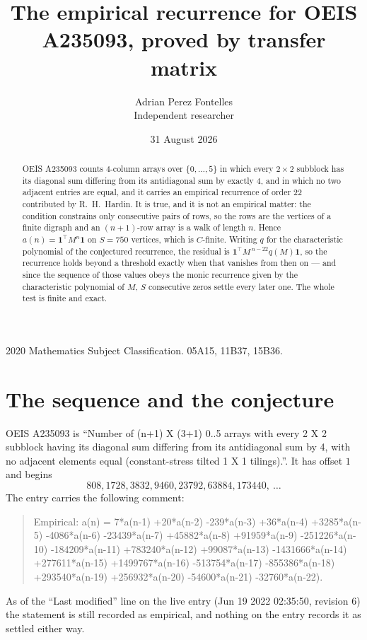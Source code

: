 \documentclass[11pt,a4paper]{article}
\title{The empirical recurrence for OEIS A235093, proved by transfer matrix}
\author{Adrian Perez Fontelles\\ \small Independent researcher}
\date{31 August 2026}
\theoremstyle{plain}
\theoremstyle{definition}
\begin{document}
\maketitle

\begin{abstract}
OEIS A235093 counts $4$-column arrays over $\{0,\dots,5\}$ in which every
$2\times2$ subblock has its diagonal sum differing from its antidiagonal sum by
exactly $4$, and in which no two adjacent entries are equal, and it
carries an empirical recurrence of order $22$ contributed by R.~H.~Hardin. It is true,
and it is not an empirical matter: the condition constrains only consecutive pairs of rows,
so the rows are the vertices of a finite digraph and an $(n+1)$-row array is a walk of
length $n$. Hence $a(n)=\mathbf{1}^{\!\top}M^{n}\mathbf{1}$ on $S=750$ vertices, which
is $C$-finite. Writing $q$ for the characteristic polynomial of the conjectured recurrence,
the residual is $\mathbf{1}^{\!\top}M^{\,n-22}q(M)\mathbf{1}$, so the recurrence
holds beyond a threshold exactly when that vanishes from then on --- and since the sequence
of those values obeys the monic recurrence given by the characteristic polynomial of $M$,
$S$ consecutive zeros settle every later one. The whole test is finite and exact.
\end{abstract}

\noindent\small 2020 Mathematics Subject Classification. 05A15, 11B37, 15B36.\normalsize

\section{The sequence and the conjecture}

OEIS A235093 is ``Number of (n+1) X (3+1) 0..5 arrays with every 2 X 2 subblock having its diagonal sum differing from its antidiagonal sum by 4, with no adjacent elements equal (constant-stress tilted 1 X 1 tilings).''. It has offset
$1$ and begins
\[
808, 1728, 3832, 9460, 23792, 63884, 173440,\ \dots
\]
The entry carries the following comment:
\begin{quote}\small
Empirical: a(n) = 7*a(n-1) +20*a(n-2) -239*a(n-3) +36*a(n-4) +3285*a(n-5) -4086*a(n-6) -23439*a(n-7) +45882*a(n-8) +91959*a(n-9) -251226*a(n-10) -184209*a(n-11) +783240*a(n-12) +99087*a(n-13) -1431666*a(n-14) +277611*a(n-15) +1499767*a(n-16) -513754*a(n-17) -855386*a(n-18) +293540*a(n-19) +256932*a(n-20) -54600*a(n-21) -32760*a(n-22).
\end{quote}
As of the ``Last modified'' line on the live entry (Jun 19 2022 02:35:50, revision 6) the statement is
still recorded as empirical, and nothing on the entry records it as settled either way.
\end{document}
